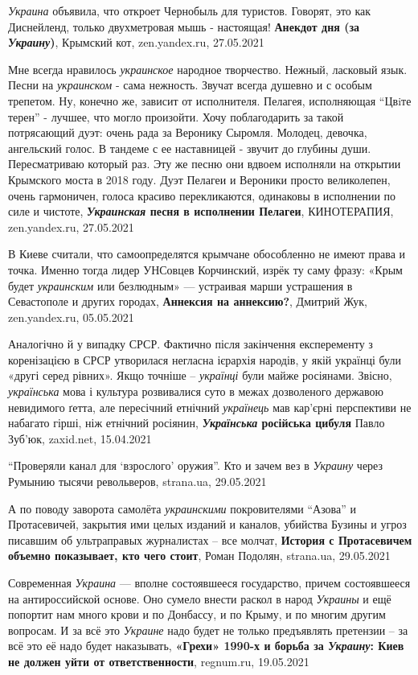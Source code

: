 \emph{Украина} объявила, что откроет Чернобыль для туристов. Говорят, это как
Диснейленд, только двухметровая мышь - настоящая!  \textbf{Анекдот дня (за
\emph{Украину})}, Крымский кот, zen.yandex.ru, 27.05.2021

Мне всегда нравилось \emph{украинское} народное творчество. Нежный, ласковый
язык.  Песни на \emph{украинском} - сама нежность. Звучат всегда душевно и с
особым трепетом.  Ну, конечно же, зависит от исполнителя.  Пелагея, исполняющая
\enquote{Цвiте терен} - лучшее, что могло произойти.  Хочу поблагодарить за
такой потрясающий дуэт: очень рада за Веронику Сыромля. Молодец, девочка,
ангельский голос. В тандеме с ее наставницей - звучит до глубины души.
Пересматриваю который раз.  Эту же песню они вдвоем исполняли на открытии
Крымского моста в 2018 году. Дуэт Пелагеи и Вероники просто великолепен, очень
гармоничен, голоса красиво перекликаются, одинаковы в исполнении по силе и
чистоте, \textbf{\emph{Украинская} песня в исполнении Пелагеи}, КИНОТЕРАПИЯ,
zen.yandex.ru, 27.05.2021

В Киеве считали, что самоопределятся крымчане обособленно не имеют права и
точка. Именно тогда лидер УНСовцев Корчинский, изрёк ту саму фразу: «Крым будет
\emph{украинским} или безлюдным» — устраивая марши устрашения в Севастополе и
других городах, \textbf{Аннексия на аннексию?}, Дмитрий Жук, zen.yandex.ru,
05.05.2021

Аналогічно й у випадку СРСР. Фактично після закінчення експеременту з
коренізацією в СРСР утворилася негласна ієрархія народів, у якій українці були
«другі серед рівних». Якщо точніше – \emph{українці} були майже росіянами. Звісно,
\emph{українська} мова і культура розвивалися суто в межах дозволеного державою
невидимого ґетта, але пересічний етнічний \emph{українець} мав кар'єрні перспективи не
набагато гірші, ніж етнічний росіянин, 
\textbf{\emph{Українська} російська цибуля} Павло Зуб'юк, zaxid.net, 15.04.2021

\enquote{Проверяли канал для \enquote{взрослого} оружия}. Кто и зачем вез в
\emph{Украину} через Румынию тысячи револьверов, strana.ua, 29.05.2021

А по поводу заворота самолёта \emph{украинскими} покровителями \enquote{Азова}
и Протасевичей, закрытия ими целых изданий и каналов, убийства Бузины и угроз
писавшим об ультраправых журналистах -- все молчат, \textbf{История с
Протасевичем объемно показывает, кто чего стоит}, Роман Подолян, strana.ua,
29.05.2021

Современная \emph{Украина} — вполне состоявшееся государство, причем
состоявшееся на антироссийской основе. Оно сумело внести раскол в народ
\emph{Украины} и ещё попортит нам много крови и по Донбассу, и по Крыму, и по
многим другим вопросам. И за всё это \emph{Украине} надо будет не только
предъявлять претензии – за всё это её надо будет наказывать, \textbf{«Грехи»
1990-х и борьба за \emph{Украину}: Киев не должен уйти от ответственности},
regnum.ru, 19.05.2021

